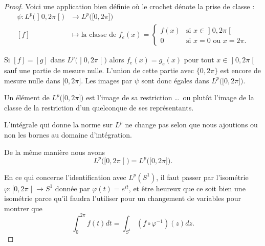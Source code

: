 \begin{proof}
    Voici une application bien définie où le crochet dénote la prise de classe :
    \begin{equation}
        \begin{aligned}
        \psi\colon L^p\big(\mathopen] 0 , 2\pi \mathclose[\big)&\to L^p\big(\mathopen[ 0 , 2\pi \mathclose]\big) \\
                [f]&\mapsto \text{la classe de } f_e(x)=\begin{cases}
                    f(x)    &   \text{si } x\in\mathopen] 0 , 2\pi \mathclose[\\
                    0    &    \text{si } x=0\text{ ou } x=2\pi.
                \end{cases}
        \end{aligned}
    \end{equation}
    \begin{subproof}
        \item[Injective]
            Si \( [f]=[g]\) dans \( L^p\big(\mathopen] 0 , 2\pi \mathclose[\big)\) alors \( f_e(x)=g_e(x)\) pour tout \( x\in \mathopen] 0 , 2\pi \mathclose[ \) sauf une partie de mesure nulle. L'union de cette partie avec \( \{ 0,2\pi \}\) est encore de mesure nulle dans \( \mathopen[ 0 , 2\pi \mathclose]\). Les images par \( \psi\) sont donc égales dans \( L^p\big( \mathopen[ 0 , 2\pi \mathclose] \big)\).
            \item[Surjective]
                Un élément de \( L^p\big( \mathopen[ 0 , 2\pi \mathclose] \big)\) est l'image de sa restriction \ldots\ ou plutôt l'image de la classe de la restriction d'un quelconque de ses représentants.
            \item[Isométrie]
                L'intégrale qui donne la norme sur \( L^p\) ne change pas selon que nous ajoutions ou non les bornes au domaine d'intégration.
    \end{subproof}

    De la même manière nous avons
    \begin{equation}
        L^p\big( \mathopen[ 0 , 2\pi \mathclose[ \big)=L^p\big( \mathopen[ 0 , 2\pi \mathclose] \big).
    \end{equation}

    En ce qui concerne l'identification avec \( L^p(S^1)\), il faut passer par l'isométrie \( \varphi\colon \mathopen[ 0 , 2\pi \mathclose[\to S^1\) donnée par \( \varphi(t)= e^{it}\), et être heureux que ce soit bien une isométrie parce qu'il faudra l'utiliser pour un changement de variables pour montrer que
        \begin{equation}
            \int_0^{2\pi}f(t)dt=\int_{S^1}(f\circ\varphi^{-1})(z)dz.
        \end{equation}
\end{proof}

